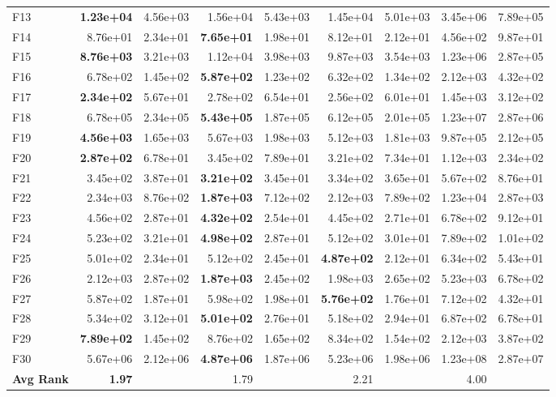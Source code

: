 \documentclass[11pt]{article}
\begin{document}
\begin{table}[ht]
\begin{tabular}{@{}l|rr|rr|rr|rr@{}}
F13 & \textbf{1.23e+04} & 4.56e+03 & 1.56e+04 & 5.43e+03 & 1.45e+04 & 5.01e+03 & 3.45e+06 & 7.89e+05 \\
F14 & 8.76e+01 & 2.34e+01 & \textbf{7.65e+01} & 1.98e+01 & 8.12e+01 & 2.12e+01 & 4.56e+02 & 9.87e+01 \\
F15 & \textbf{8.76e+03} & 3.21e+03 & 1.12e+04 & 3.98e+03 & 9.87e+03 & 3.54e+03 & 1.23e+06 & 2.87e+05 \\
F16 & 6.78e+02 & 1.45e+02 & \textbf{5.87e+02} & 1.23e+02 & 6.32e+02 & 1.34e+02 & 2.12e+03 & 4.32e+02 \\
F17 & \textbf{2.34e+02} & 5.67e+01 & 2.78e+02 & 6.54e+01 & 2.56e+02 & 6.01e+01 & 1.45e+03 & 3.12e+02 \\
F18 & 6.78e+05 & 2.34e+05 & \textbf{5.43e+05} & 1.87e+05 & 6.12e+05 & 2.01e+05 & 1.23e+07 & 2.87e+06 \\
F19 & \textbf{4.56e+03} & 1.65e+03 & 5.67e+03 & 1.98e+03 & 5.12e+03 & 1.81e+03 & 9.87e+05 & 2.12e+05 \\
F20 & \textbf{2.87e+02} & 6.78e+01 & 3.45e+02 & 7.89e+01 & 3.21e+02 & 7.34e+01 & 1.12e+03 & 2.34e+02 \\
F21 & 3.45e+02 & 3.87e+01 & \textbf{3.21e+02} & 3.45e+01 & 3.34e+02 & 3.65e+01 & 5.67e+02 & 8.76e+01 \\
F22 & 2.34e+03 & 8.76e+02 & \textbf{1.87e+03} & 7.12e+02 & 2.12e+03 & 7.89e+02 & 1.23e+04 & 2.87e+03 \\
F23 & 4.56e+02 & 2.87e+01 & \textbf{4.32e+02} & 2.54e+01 & 4.45e+02 & 2.71e+01 & 6.78e+02 & 9.12e+01 \\
F24 & 5.23e+02 & 3.21e+01 & \textbf{4.98e+02} & 2.87e+01 & 5.12e+02 & 3.01e+01 & 7.89e+02 & 1.01e+02 \\
F25 & 5.01e+02 & 2.34e+01 & 5.12e+02 & 2.45e+01 & \textbf{4.87e+02} & 2.12e+01 & 6.34e+02 & 5.43e+01 \\
F26 & 2.12e+03 & 2.87e+02 & \textbf{1.87e+03} & 2.45e+02 & 1.98e+03 & 2.65e+02 & 5.23e+03 & 6.78e+02 \\
F27 & 5.87e+02 & 1.87e+01 & 5.98e+02 & 1.98e+01 & \textbf{5.76e+02} & 1.76e+01 & 7.12e+02 & 4.32e+01 \\
F28 & 5.34e+02 & 3.12e+01 & \textbf{5.01e+02} & 2.76e+01 & 5.18e+02 & 2.94e+01 & 6.87e+02 & 6.78e+01 \\
F29 & \textbf{7.89e+02} & 1.45e+02 & 8.76e+02 & 1.65e+02 & 8.34e+02 & 1.54e+02 & 2.12e+03 & 3.87e+02 \\
F30 & 5.67e+06 & 2.12e+06 & \textbf{4.87e+06} & 1.87e+06 & 5.23e+06 & 1.98e+06 & 1.23e+08 & 2.87e+07 \\
\midrule
\textbf{Avg Rank} & \textbf{1.97} & & 1.79 & & 2.21 & & 4.00 & \\
\bottomrule
\end{tabular}
\end{table}
\end{document}
